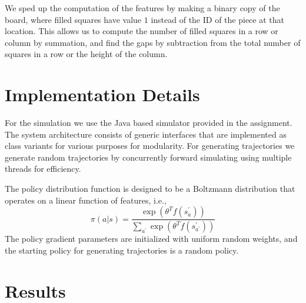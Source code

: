 \documentclass[11pt]{article}
\begin{document}
We sped up the computation of the features by making a binary copy of the board, where filled squares have value $1$ instead of the ID of the piece at that location.  This allows us to compute the number of filled squares in a row or column by summation, and find the gaps by subtraction from the total number of squares in a row or the height of the column.


\section{Implementation Details}
For the simulation we use the Java based simulator provided in the assignment. The system architecture consists of generic interfaces that are implemented as class variants for various purposes for modularity. For generating trajectories we generate random trajectories by concurrently forward simulating using multiple threads for efficiency.

The policy distribution function is designed to be a Boltzmann distribution that operates on a linear function of features, i.e.,
\[ \pi(a|s)=\frac{\exp\left(\theta^{T}f\left(s_{a}^{\prime}\right)\right)}{\underset{a^{\prime}}{\sum}\exp\left(\theta^{T}f\left(s_{a^{\prime}}^{\prime}\right)\right)} \]
 The policy gradient parameters are initialized with uniform random weights, and the starting policy for generating trajectories is a random policy.


\section{Results}
\end{document}
